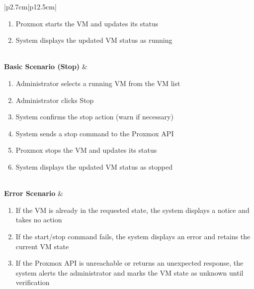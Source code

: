 \begin{table}[H]
\begin{tabular}{|p{2.7cm}|p{12.5cm}|}
\begin{minipage}[t]{\linewidth}
\begin{enumerate}[topsep=0pt,itemsep=1pt,parsep=0pt,partopsep=0pt]
                                          \item Proxmox starts the VM and updates its status
                                          \item System displays the updated VM status as running
                                      \end{enumerate}
                                  \end{minipage}                 \\
        \hline
        \textbf{Basic Scenario (Stop)} & \begin{minipage}[t]{\linewidth}
                                      \begin{enumerate}[topsep=0pt,itemsep=1pt,parsep=0pt,partopsep=0pt]
                                          \item Administrator selects a running VM from the VM list
                                          \item Administrator clicks Stop
                                          \item System confirms the stop action (warn if necessary)
                                          \item System sends a stop command to the Proxmox API
                                          \item Proxmox stops the VM and updates its status
                                          \item System displays the updated VM status as stopped
                                      \end{enumerate}
                                  \end{minipage}                        \\
        \hline
        \textbf{Error Scenario} & \begin{minipage}[t]{\linewidth}
                                      \begin{enumerate}[topsep=0pt,itemsep=1pt,parsep=0pt,partopsep=0pt]
                                          \item If the VM is already in the requested state, the system displays a notice and takes no action
                                          \item If the start/stop command fails, the system displays an error and retains the current VM state
                                          \item If the Proxmox API is unreachable or returns an unexpected response, the system alerts the administrator and marks the VM state as unknown until verification
                                      \end{enumerate}
                                  \end{minipage} \\
        \hline
    \end{tabular}
    \label{tab:admin-start-stop-vm}
\end{table}
